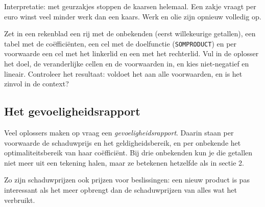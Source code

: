 {Interpretatie: met geurzakjes stoppen de kaarsen helemaal. Een zakje vraagt per euro winst veel minder werk dan een kaars. Werk en olie zijn opnieuw volledig op.}

\begin{werkwijze}
Zet in een rekenblad een rij met de onbekenden (eerst willekeurige getallen), een tabel met de coëfficiënten, een cel met de doelfunctie (\texttt{SOMPRODUCT}) en per voorwaarde een cel met het linkerlid en een met het rechterlid. Vul in de oplosser het doel, de veranderlijke cellen en de voorwaarden in, en kies niet-negatief en lineair. Controleer het resultaat: voldoet het aan alle voorwaarden, en is het zinvol in de context?
\end{werkwijze}

\subsection{Het gevoeligheidsrapport}

Veel oplossers maken op vraag een \emph{gevoeligheidsrapport}. Daarin staan per voorwaarde de schaduwprijs en het geldigheidsbereik, en per onbekende het optimaliteitsbereik van haar coëfficiënt. Bij drie onbekenden kun je die getallen niet meer uit een tekening halen, maar ze betekenen hetzelfde als in sectie 2.


Zo zijn schaduwprijzen ook prijzen voor beslissingen: een nieuw product is pas interessant als het meer opbrengt dan de schaduwprijzen van alles wat het verbruikt.

